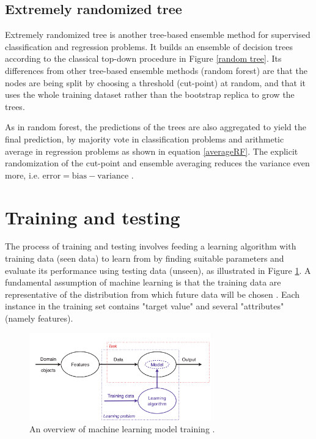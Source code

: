 \subsection{Extremely randomized tree}

Extremely randomized tree is another tree-based ensemble method for supervised classification and regression problems. It builds an ensemble of decision trees according to the classical top-down procedure in Figure \ref{random tree}. Its differences from other tree-based ensemble methods (random forest) are that the nodes are being split by choosing a threshold (cut-point) at random, and that it uses the whole training dataset rather than the bootstrap replica to grow the trees.  

As in random forest, the predictions of the trees are also aggregated to yield the final prediction, by majority vote in classification problems and arithmetic average in regression problems as shown in equation \ref{averageRF}. The explicit randomization of the cut-point and ensemble averaging reduces the variance even more, i.e. $\text{error}=\text{bias} - \text{variance}$ \citep{geurts2006extremely}. 
\section{Training and testing}
\label{TT}
The process of training and testing involves feeding a learning algorithm with training data (seen data) to learn from by finding suitable parameters and evaluate its performance using testing data (unseen), as illustrated in Figure \ref{overview}. A fundamental assumption of machine learning is that the training data are representative of the distribution from which future data  will be chosen \citep{witten2016data}. Each instance in the training set contains "target value" and several "attributes" (namely features). 

\begin{figure}[H]
  \centering
    \includegraphics[width=0.7\textwidth]{images/MLSampler.png}
    \caption{An overview of machine learning model training \citep{flach2012machine}.}
  \label{overview}
\end{figure}

